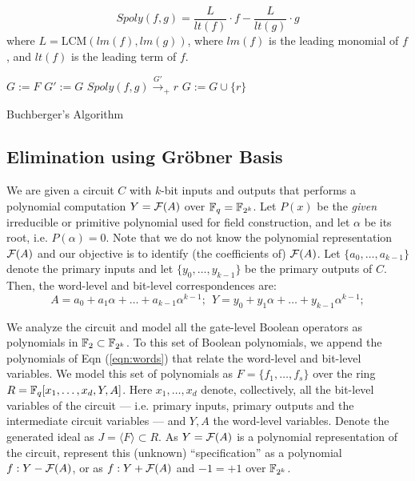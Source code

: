 \documentclass[conference,10pt]{IEEEtran}
\begin{document}
\begin{equation}
       Spoly(f,g)=\frac{L}{lt(f)}\cdot f - \frac{L}{lt(g)}\cdot g \nonumber
      \label{eqn:spoly}
\end{equation}
where $L = \text{LCM}(lm(f), lm(g))$, where $lm(f)$ is the leading
monomial of $f$, and $lt(f)$ is the leading term of $f$. 


\begin{algorithm}[hbt]
\SetAlgoNoLine
  $G:= F$\;
  {
  	$G' := G$\;
	{
		$Spoly(f, g) \stackrel{G'}{\textstyle\longrightarrow}_+r$ \;
		{
			$G:= G \cup \{r\}$ \;
		}
	}
   }
\caption {Buchberger's Algorithm}\label{alg:gb}
\end{algorithm}

\subsection{Elimination using Gr\"obner Basis}
\label{sec:elim}
We are given a circuit $C$ with $k$-bit inputs and outputs that
performs a polynomial computation $Y = {\mathcal{F}}(A)$ over ${\mathbb{F}}_{q} = {\mathbb{F}}_{2^k}$. Let
$P(x)$ be the {\it given} irreducible or primitive polynomial used for
field construction, and let $\alpha$ be its root, i.e. $P(\alpha) = 0
$. Note that we do not know the polynomial representation
${\mathcal{F}}(A)$ and our objective is to identify (the coefficients of)
${\mathcal{F}}(A)$. Let $\{a_0, \dots, a_{k-1}\}$ denote the primary inputs and
let $\{y_0, \dots, y_{k-1}\}$ be the primary outputs of $C$. Then, the
word-level and bit-level correspondences are: 
\begin{equation}
\label{eqn:words}
 A = a_0 + a_1 \alpha + \dots + a_{k-1} \alpha^{k-1}; ~~ Y = y_0 +
y_1 \alpha + \dots + y_{k-1} \alpha^{k-1};
\end{equation}

We analyze the circuit and model all the gate-level Boolean operators
as polynomials in ${\mathbb{F}}_2 \subset {\mathbb{F}}_{2^k}$. To this set of
Boolean polynomials, we append the polynomials of Eqn
(\ref{eqn:words}) that relate the word-level and bit-level
variables. We model this set of polynomials as $F = \{f_1, \dots,
f_s\}$ over the ring $R = {\mathbb{F}}_{q}[x_1, \dots, x_d, Y, A]$. Here $x_1,
\dots, x_d$ denote, collectively, all the bit-level variables of the
circuit --- i.e. primary inputs, primary outputs and the intermediate
circuit variables --- and $Y, A$ the word-level variables. Denote the
generated ideal as $J = \langle F \rangle \subset R$. As $Y = {\mathcal{F}}(A)$
is a polynomial representation of the circuit, represent this (unknown)
``specification'' as a polynomial $f: Y - {\mathcal{F}}(A)$, or as $f: Y + {\mathcal{F}}(A)$
and $-1 = +1$ over ${\mathbb{F}}_{2^k}$.  
\end{document}
